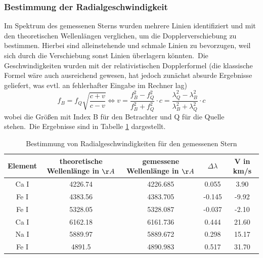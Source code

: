 \subsubsection{Bestimmung der Radialgeschwindigkeit}
Im Spektrum des gemessenen Sterns wurden mehrere Linien identifiziert und mit den theoretischen Wellenlängen verglichen, um die Dopplerverschiebung zu bestimmen. Hierbei sind alleinstehende und schmale Linien zu bevorzugen, weil sich durch die Verschiebung sonst Linien überlagern könnten.\
Die Geschwindigkeiten wurden mit der relativistischen Dopplerformel (die klassische Formel wäre auch ausreichend gewesen, hat jedoch zunächst absurde Ergebnisse geliefert, was evtl. an fehlerhafter Eingabe im Rechner lag)
\begin{equation}
f_B = f_Q \sqrt{\frac{c+v}{c-v}} \Leftrightarrow v = \frac{f_B^2 - f_Q^2}{f_B^2 + f_Q^2} \cdot c = \frac{\lambda_Q^2 - \lambda_B^2}{\lambda_B^2 + \lambda_Q^2}\cdot c
\end{equation}
wobei die Größen mit Index B für den Betrachter und Q für die Quelle stehen.\
Die Ergebnisse sind in Tabelle \ref{tab:Radial} dargestellt.

\begin{table}[htbp]
\begin{tabular}{c|c|c|c|c}
Element & theoretische Wellenlänge in $\AA$ & gemessene Wellenlänge in $\AA$ & $\Delta\lambda$ & V in km/s \\ \hline
Ca I & 4226.74 & 4226.685 & 0.055 & 3.90 \\ 
Fe I & 4383.56 & 4383.705 & -0.145 & -9.92 \\ 
Fe I & 5328.05 & 5328.087 & -0.037 & -2.10 \\ 
Ca I & 6162.18 & 6161.736 & 0.444 & 21.60 \\ 
Na I & 5889.97 & 5889.672 & 0.298 & 15.17 \\ 
Fe I & 4891.5 & 4890.983 & 0.517 & 31.70 \\ 
\end{tabular}
\caption{Bestimmung von Radialgeschwindigkeiten für den gemessenen Stern}
\label{tab:Radial}
\end{table}


